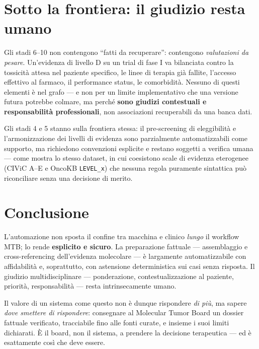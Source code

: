 \documentclass[11pt,a4paper]{report}
\begin{document}
\section{Sotto la frontiera: il giudizio resta umano}

Gli stadi 6--10 non contengono ``fatti da recuperare'': contengono
\emph{valutazioni da pesare}. Un'evidenza di livello D su un trial di fase I
va bilanciata contro la tossicità attesa nel paziente specifico, le linee di
terapia già fallite, l'accesso effettivo al farmaco, il performance status,
le comorbidità. Nessuno di questi elementi è nel grafo --- e non per un
limite implementativo che una versione futura potrebbe colmare, ma perché
\textbf{sono giudizi contestuali e responsabilità professionali}, non
associazioni recuperabili da una banca dati.

Gli stadi 4 e 5 stanno sulla frontiera stessa: il pre-screening di
eleggibilità e l'armonizzazione dei livelli di evidenza sono
parzialmente automatizzabili come supporto, ma richiedono convenzioni
esplicite e restano soggetti a verifica umana --- come mostra lo stesso
dataset, in cui coesistono scale di evidenza eterogenee (CIViC A--E e
OncoKB \texttt{LEVEL\_x}) che nessuna regola puramente sintattica può
riconciliare senza una decisione di merito.

\section{Conclusione}

L'automazione non sposta il confine tra macchina e clinico \emph{lungo} il
workflow MTB; lo rende \textbf{esplicito e sicuro}. La preparazione fattuale
--- assemblaggio e cross-referencing dell'evidenza molecolare --- è
largamente automatizzabile con affidabilità e, soprattutto, con astensione
deterministica sui casi senza risposta. Il giudizio multidisciplinare ---
ponderazione, contestualizzazione al paziente, priorità, responsabilità ---
resta intrinsecamente umano.

Il valore di un sistema come questo non è dunque rispondere \emph{di più},
ma sapere \emph{dove smettere di rispondere}: consegnare al Molecular Tumor
Board un dossier fattuale verificato, tracciabile fino alle fonti curate, e
insieme i suoi limiti dichiarati. È il board, non il sistema, a prendere la
decisione terapeutica --- ed è esattamente così che deve essere.
\end{document}
